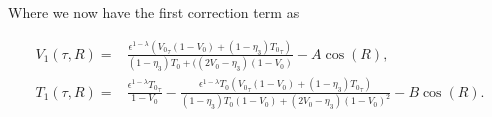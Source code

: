 Where we now have the first correction term as

\begin{equation*}
\begin{aligned}
V_1(\tau,R)=& \frac{\epsilon^{1-\lambda}({V_0}_\tau(1-V_0)+(1-\eta_3){T_0}_\tau)}{(1-\eta_3)T_0+((2V_0-\eta_3)(1-V_0)}-A\cos(R),\\
T_1(\tau,R)=&\frac{\epsilon^{1-\lambda}{T_0}_\tau}{1-V_0}-\frac{\epsilon^{1-\lambda}T_0({V_0}_\tau(1-V_0)+(1-\eta_3){T_0}_\tau)}{(1-\eta_3)T_0(1-V_0)+(2V_0-\eta_3)(1-V_0)^2}-B\cos(R).
\end{aligned}
\end{equation*}